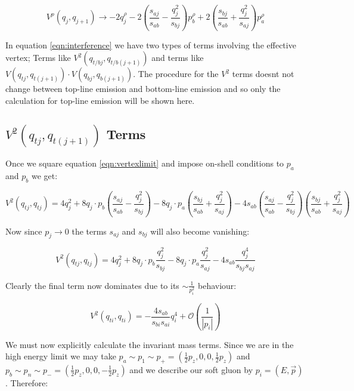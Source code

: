 			\begin{equation}
			 V^\rho(q_j, q_{j+1}) \rightarrow -2q_j^\rho - 2\left(\frac{s_{aj}}{s_{ab}} - \frac{q^2_{j}}{s_{bj}}\right)p_b^\rho + 2\left(\frac{s_{bj}}{s_{ab}} + \frac{q_j^2}{s_{aj}}\right)p_a^\rho
			\label{eqn:vertexlimit}
			\end{equation}

			In equation \ref{eqn:interference} we have two types of terms involving the effective vertex; Terms like $V^2(q_{t/bj}, q_{t/b(j+1)})$ and terms like $V(q_{tj}, q_{t(j+1)})\cdot V(q_{bj}, q_{b(j+1)})$.  The procedure for the $V^2$ terms doesnt not change between top-line emission and bottom-line emission and so only the calculation for top-line emission will be shown here.

		\subsection{$V^2(q_{tj}, q_{t(j+1)})$ Terms}
		\label{sub:subsection_name}

			Once we square equation \ref{eqn:vertexlimit} and impose on-shell conditions to $p_a$ and $p_b$ we get:

			\begin{equation}
			V^2(q_{tj}, q_{tj}) = 4q_j^2 + 8 q_j\cdot p_b \left(\frac{s_{aj}}{s_{ab}} - \frac{q^2_{j}}{s_{bj}}\right) - 8 q_j\cdot p_a \left(\frac{s_{bj}}{s_{ab}} + \frac{q_j^2}{s_{aj}}\right) - 4s_{ab}\left(\frac{s_{aj}}{s_{ab}} - \frac{q^2_{j}}{s_{bj}}\right)\left(\frac{s_{bj}}{s_{ab}} + \frac{q_j^2}{s_{aj}}\right)
			\end{equation}

			Now since $p_j\rightarrow0$ the terms $s_{aj}$ and $s_{bj}$ will also become vanishing:

			\begin{equation}
			V^2(q_{tj}, q_{tj}) = 4q_j^2 + 8 q_j\cdot p_b \frac{q^2_{j}}{s_{bj}} - 8 q_j\cdot p_a \frac{q_j^2}{s_{aj}} - 4s_{ab}\frac{q^4_{j}}{s_{bj}s_{aj}}
			\end{equation}

			Clearly the final term now dominates due to its $\sim\frac{1}{p_i^2}$ behaviour:

			\begin{equation}
			V^2(q_{ti}, q_{ti}) = - \frac{4s_{ab}}{s_{bi}s_{ai}}q^4_{i} + \mathcal{O}\left(\frac{1}{|p_i|}\right)
			\label{eqn:temp}
			\end{equation}

			We must now explicitly calculate the invariant mass terms.  Since we are in the high energy limit we may take $p_a\sim p_1 \sim p_+ = (\frac12 p_z, 0, 0, \frac12 p_z)$ and $p_b\sim p_n \sim p_- = (\frac12 p_z, 0, 0, -\frac12 p_z)$ and we describe our soft gluon by $p_i=(E, \vec{p})$.  Therefore:

